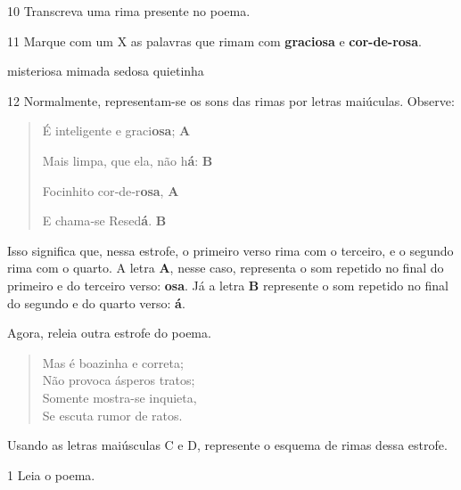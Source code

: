 \num{10} Transcreva uma rima presente no poema.


\num{11} Marque com um X as palavras que rimam com \textbf{graciosa} e \textbf{cor-de-rosa}.

\begin{boxlist}
\boxitem[X] misteriosa
\boxitem[] mimada
\boxitem[X] sedosa
\boxitem[] quietinha
\end{boxlist}

\num{12} Normalmente, representam-se os sons das rimas por letras maiúculas. Observe:

\begin{quote}
É inteligente e graci\textbf{osa}; \textbf{A}

Mais limpa, que ela, não h\textbf{á}: \textbf{B}

Focinhito cor‑de‑r\textbf{osa}, \textbf{A}

E chama‑se Resed\textbf{á}. \textbf{B}
\end{quote}

Isso significa que, nessa estrofe, o primeiro verso rima com o terceiro, e o segundo rima com o quarto. A letra \textbf{A}, nesse caso, representa o som repetido no final do primeiro e do terceiro verso: \textbf{osa}. Já a letra \textbf{B} represente o som repetido no final do segundo e do quarto verso: \textbf{á}.

Agora, releia outra estrofe do poema.

\begin{verse}
Mas é boazinha e correta;\\
Não provoca ásperos tratos;\\
Somente mostra-se inquieta,\\
Se escuta rumor de ratos.
\end{verse}

Usando as letras maiúsculas C e D, represente o esquema de rimas dessa estrofe.



\num{1} Leia o poema.

